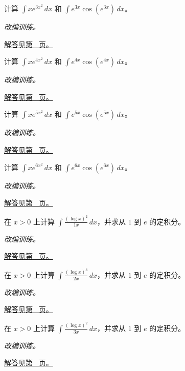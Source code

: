 \documentclass[12pt,fontset=fandol]{ctexart}
\begin{document}
\begin{example}[指数复合的反向链式法则]\label{ex:c12q15}
计算 $\displaystyle\int x e^{3x^2}\,dx$ 和 $\displaystyle\int e^{3x}\cos(e^{3x})\,dx$。
\par\textit{改编训练。}\par\hyperref[ans:c12q15]{解答见第~\pageref{ans:c12q15} 页。}
\end{example}
\begin{example}[指数复合的反向链式法则]\label{ex:c12q16}
计算 $\displaystyle\int x e^{4x^2}\,dx$ 和 $\displaystyle\int e^{4x}\cos(e^{4x})\,dx$。
\par\textit{改编训练。}\par\hyperref[ans:c12q16]{解答见第~\pageref{ans:c12q16} 页。}
\end{example}
\begin{example}[指数复合的反向链式法则]\label{ex:c12q17}
计算 $\displaystyle\int x e^{5x^2}\,dx$ 和 $\displaystyle\int e^{5x}\cos(e^{5x})\,dx$。
\par\textit{改编训练。}\par\hyperref[ans:c12q17]{解答见第~\pageref{ans:c12q17} 页。}
\end{example}
\begin{example}[指数复合的反向链式法则]\label{ex:c12q18}
计算 $\displaystyle\int x e^{6x^2}\,dx$ 和 $\displaystyle\int e^{6x}\cos(e^{6x})\,dx$。
\par\textit{改编训练。}\par\hyperref[ans:c12q18]{解答见第~\pageref{ans:c12q18} 页。}
\end{example}
\begin{example}[对数幂与变量范围]\label{ex:c12q19}
在 $x>0$ 上计算 $\displaystyle\int\frac{(\log x)^{2}}{1x}\,dx$，并求从 $1$ 到 $e$ 的定积分。
\par\textit{改编训练。}\par\hyperref[ans:c12q19]{解答见第~\pageref{ans:c12q19} 页。}
\end{example}
\begin{example}[对数幂与变量范围]\label{ex:c12q20}
在 $x>0$ 上计算 $\displaystyle\int\frac{(\log x)^{3}}{2x}\,dx$，并求从 $1$ 到 $e$ 的定积分。
\par\textit{改编训练。}\par\hyperref[ans:c12q20]{解答见第~\pageref{ans:c12q20} 页。}
\end{example}
\begin{example}[对数幂与变量范围]\label{ex:c12q21}
在 $x>0$ 上计算 $\displaystyle\int\frac{(\log x)^{2}}{3x}\,dx$，并求从 $1$ 到 $e$ 的定积分。
\par\textit{改编训练。}\par\hyperref[ans:c12q21]{解答见第~\pageref{ans:c12q21} 页。}
\end{example}
\end{document}

